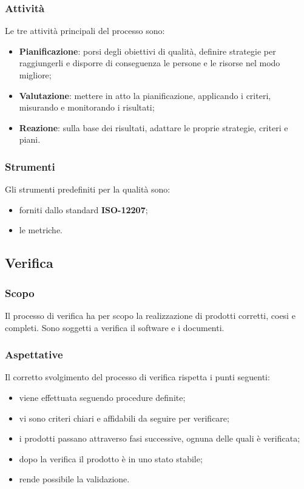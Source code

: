 	\subsubsection{Attività}
	Le tre attività principali del processo sono:
	\begin{itemize}
		\item \textbf{Pianificazione}: porsi degli obiettivi di qualità, definire strategie per raggiungerli e disporre di conseguenza le persone e le risorse nel modo migliore;
		\item \textbf{Valutazione}: mettere in atto la pianificazione, applicando i criteri, misurando e monitorando i risultati; 
		\item \textbf{Reazione}: sulla base dei risultati, adattare le proprie strategie, criteri e piani.
	\end{itemize}
	\subsubsection{Strumenti}
	Gli strumenti predefiniti per la qualità sono: 
	\begin{itemize}
		\item forniti dallo standard \textbf{ISO-12207};
		\item le metriche.
	\end{itemize} 
		
\subsection{Verifica}
	\subsubsection{Scopo}
	Il processo di verifica ha per scopo la realizzazione di prodotti corretti, coesi e completi. Sono soggetti a verifica il software e i documenti. 
	\subsubsection{Aspettative}
	Il corretto svolgimento del processo di verifica rispetta i punti seguenti:	
	\begin{itemize}
		\item viene effettuata seguendo procedure definite;
		\item vi sono criteri chiari e affidabili da seguire per verificare;
		\item i prodotti passano attraverso fasi successive, ognuna delle quali è verificata;
		\item dopo la verifica il prodotto è in uno stato stabile;
		\item rende possibile la validazione.
	\end{itemize}

